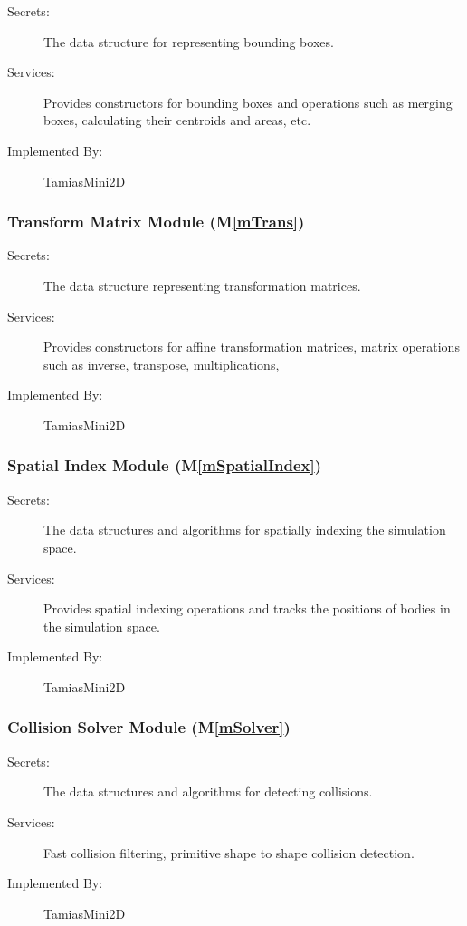 \documentclass[12pt]{article}
\newcommand{\mref}[1]{M\ref{#1}}
\begin{document}
\begin{description}
	\item[Secrets:] The data structure for representing bounding boxes.
	\item[Services:] Provides constructors for bounding boxes and operations such as merging boxes, calculating their centroids and areas, etc.
	\item[Implemented By:] TamiasMini2D
\end{description}

\subsubsection{Transform Matrix Module (\mref{mTrans})}

\begin{description}
	\item[Secrets:] The data structure representing transformation matrices.
	\item[Services:] Provides constructors for affine transformation matrices, matrix operations such as inverse, transpose, multiplications, %
	\item[Implemented By:] TamiasMini2D
\end{description}

\subsubsection{Spatial Index Module (\mref{mSpatialIndex})}

\begin{description}
	\item[Secrets:] The data structures and algorithms for spatially indexing the simulation space.
	\item[Services:] Provides spatial indexing operations and tracks the positions of bodies in the simulation space.
	\item[Implemented By:] TamiasMini2D
\end{description}

\subsubsection{Collision Solver Module (\mref{mSolver})}

\begin{description}
	\item[Secrets:] The data structures and algorithms for detecting collisions.
	\item[Services:] Fast collision filtering, primitive shape to shape collision detection.
	\item[Implemented By:] TamiasMini2D
\end{description}
\end{document}
